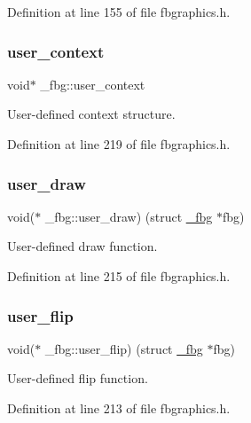 Definition at line 155 of file fbgraphics.\+h.

\mbox{\label{struct__fbg_ae3ecac18abee9dedabacaca9bb063bde}} 
\subsubsection{\texorpdfstring{user\+\_\+context}{user\_context}}
{\footnotesize\ttfamily void$\ast$ \+\_\+fbg\+::user\+\_\+context}



User-\/defined context structure. 



Definition at line 219 of file fbgraphics.\+h.

\mbox{\label{struct__fbg_ac66a762877982c6f381a7cfd54a8f17e}} 
\subsubsection{\texorpdfstring{user\+\_\+draw}{user\_draw}}
{\footnotesize\ttfamily void($\ast$ \+\_\+fbg\+::user\+\_\+draw) (struct \hyperlink{struct__fbg}{\+\_\+fbg} $\ast$fbg)}



User-\/defined draw function. 



Definition at line 215 of file fbgraphics.\+h.

\mbox{\label{struct__fbg_a3f2ad2eb06555cdbe2d18f541231cb37}} 
\subsubsection{\texorpdfstring{user\+\_\+flip}{user\_flip}}
{\footnotesize\ttfamily void($\ast$ \+\_\+fbg\+::user\+\_\+flip) (struct \hyperlink{struct__fbg}{\+\_\+fbg} $\ast$fbg)}



User-\/defined flip function. 



Definition at line 213 of file fbgraphics.\+h.

